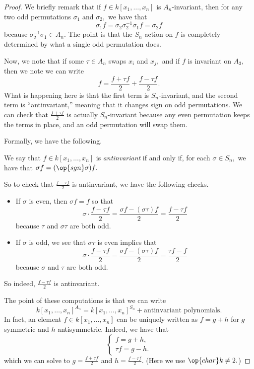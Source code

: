 \begin{proof}
	We briefly remark that if $f\in k[x_1,\ldots,x_n]$ is $A_n$-invariant, then for any two odd permutations $\sigma_1$ and $\sigma_2,$ we have that
	\[\sigma_1f=\sigma_2\sigma_2^{-1}\sigma_1f=\sigma_2f\]
	because $\sigma_2^{-1}\sigma_1\in A_n.$ The point is that the $S_n$-action on $f$ is completely determined by what a single odd permutation does.
	
	Now, we note that if some $\tau\in A_n$ swaps $x_i$ and $x_j,$ and if $f$ is invariant on $A_3,$ then we note we can write
	\[f=\frac{f+\tau f}2+\frac{f-\tau f}2.\]
	What is happening here is that the first term is $S_n$-invariant, and the second term is ``antinvariant,'' meaning that it changes sign on odd permutations. We can check that $\frac{f+\tau f}2$ is actually $S_n$-invariant because any even permutation keeps the terms in place, and an odd permutation will swap them.
	
	Formally, we have the following.
	\begin{definition}[Antinvariant]
		We say that $f\in k[x_1,\ldots,x_n]$ is \textit{antinvariant} if and only if, for each $\sigma\in S_n,$ we have that $\sigma f=(\op{sgn}\sigma)f.$
	\end{definition}
	So to check that $\frac{f-\tau f}2$ is antinvariant, we have the following checks.
	\begin{itemize}
		\item If $\sigma$ is even, then $\sigma f=f$ so that
		\[\sigma\cdot\frac{f-\tau f}2=\frac{\sigma f-(\sigma\tau)f}2=\frac{f-\tau f}2\]
		because $\tau$ and $\sigma\tau$ are both odd.
		\item If $\sigma$ is odd, we see that $\sigma\tau$ is even implies that
		\[\sigma\cdot\frac{f-\tau f}2=\frac{\sigma f-(\sigma\tau)f}2=\frac{\tau f-f}2\]
		because $\sigma$ and $\tau$ are both odd.
	\end{itemize}
	So indeed, $\frac{f-\tau f}2$ is antinvariant.

	The point of these computations is that we can write
	\[k[x_1,\ldots,x_n]^{A_n}=k[x_1,\ldots,x_n]^{S_n}+\text{antinvariant polynomials}.\]
	In fact, an element $f\in k[x_1,\ldots,x_n]$ can be uniquely written as $f=g+h$ for $g$ symmetric and $h$ antisymmetric. Indeed, we have that
	\[\begin{cases}
		f = g+h, \\
		\tau f=g-h.
	\end{cases}\]
	which we can solve to $g=\frac{f+\tau f}2$ and $h=\frac{f-\tau f}2.$ (Here we use $\op{char}k\ne2.$)


\end{proof}
